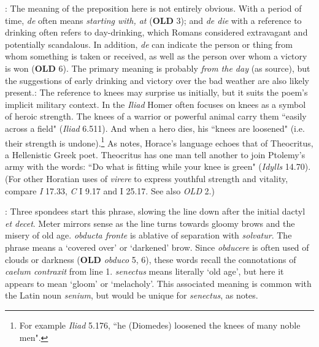 : The meaning of the preposition here is not entirely obvious.  With a period of time, \textit{de} often means \textit{starting with, at} (\textbf{OLD} 3); and \textit{de die} with a reference to drinking often refers to day-drinking, which Romans considered extravagant and potentially scandalous.  In addition, \textit{de} can indicate the person or thing from whom something is taken or received, as well as the person over whom a victory is won (\textbf{OLD} 6).  The primary meaning is probably \textit{from the day} (as source), but the suggestions of early drinking and victory over the bad weather are also likely present.\indent{}: The reference to knees may surprise us initially, but it suits the poem's implicit military context.  In the \textit{Iliad} Homer often focuses on knees as a symbol of heroic strength.  The knees of a warrior or powerful animal carry them ``easily across a field" (\textit{Iliad} 6.511).  And when a hero dies, his ``knees are loosened" (i.e. their strength is undone).\footnote{For example \textit{Iliad} 5.176, ``he (Diomedes) loosened the knees of many noble men".}  As \citet[216--217]{mankin1995} notes, Horace's language echoes that of Theocritus, a Hellenistic Greek poet. Theocritus has one man tell another to join Ptolemy's army with the words: ``Do what is fitting while your knee is green" (\textit{Idylls} 14.70).  (For other Horatian uses of \textit{virere} to express youthful strength and vitality, compare \textit{I} 17.33, \textit{C} I 9.17 and I 25.17. See also \textit{OLD} 2.)


: Three spondees start this phrase, slowing the line down after the initial dactyl \textit{et decet}.  Meter mirrors sense as the line turns towards gloomy brows and the misery of old age.  \textit{obducta fronte} is ablative of separation with \textit{solvatur}.  The phrase means a `covered over' or `darkened' brow.  Since \textit{obducere} is often used of clouds or darkness (\textbf{OLD} \textit{obduco} 5, 6), these words recall the connotations of \textit{caelum contraxit} from line 1.  \textit{senectus} means literally `old age', but here it appears to mean `gloom' or `melacholy'.  This associated meaning is common with the Latin noun \textit{senium}, but would be unique for \textit{senectus}, as \citet[217]{mankin1995} notes.


